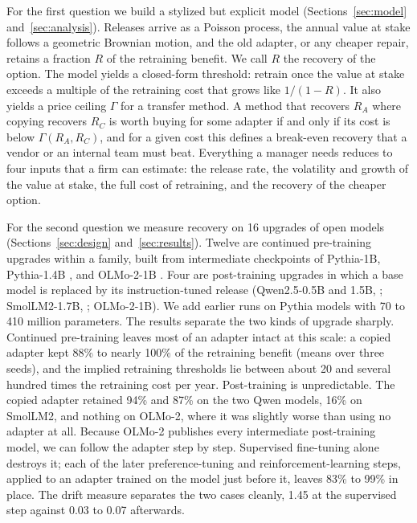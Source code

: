 \documentclass[ijds,nonblindrev]{informs4}
\begin{document}
For the first question we build a stylized but explicit model (Sections~\ref{sec:model} and~\ref{sec:analysis}). Releases arrive as a Poisson process, the annual value at stake follows a geometric Brownian motion, and the old adapter, or any cheaper repair, retains a fraction $R$ of the retraining benefit. We call $R$ the recovery of the option. The model yields a closed-form threshold: retrain once the value at stake exceeds a multiple of the retraining cost that grows like $1/(1-R)$. It also yields a price ceiling $\Gamma$ for a transfer method. A method that recovers $R_A$ where copying recovers $R_C$ is worth buying for some adapter if and only if its cost is below $\Gamma(R_A,R_C)$, and for a given cost this defines a break-even recovery that a vendor or an internal team must beat. Everything a manager needs reduces to four inputs that a firm can estimate: the release rate, the volatility and growth of the value at stake, the full cost of retraining, and the recovery of the cheaper option.

For the second question we measure recovery on 16 upgrades of open models (Sections~\ref{sec:design} and~\ref{sec:results}). Twelve are continued pre-training upgrades within a family, built from intermediate checkpoints of Pythia-1B, Pythia-1.4B \citep{biderman2023pythia}, and OLMo-2-1B \citep{olmo2024olmo2}. Four are post-training upgrades in which a base model is replaced by its instruction-tuned release (Qwen2.5-0.5B and 1.5B, \citealt{qwen2024qwen25}; SmolLM2-1.7B, \citealt{allal2025smollm2}; OLMo-2-1B). We add earlier runs on Pythia models with 70 to 410 million parameters. The results separate the two kinds of upgrade sharply. Continued pre-training leaves most of an adapter intact at this scale: a copied adapter kept 88\% to nearly 100\% of the retraining benefit (means over three seeds), and the implied retraining thresholds lie between about 20 and several hundred times the retraining cost per year. Post-training is unpredictable. The copied adapter retained 94\% and 87\% on the two Qwen models, 16\% on SmolLM2, and nothing on OLMo-2, where it was slightly worse than using no adapter at all. Because OLMo-2 publishes every intermediate post-training model, we can follow the adapter step by step. Supervised fine-tuning alone destroys it; each of the later preference-tuning and reinforcement-learning steps, applied to an adapter trained on the model just before it, leaves 83\% to 99\% in place. The drift measure separates the two cases cleanly, 1.45 at the supervised step against 0.03 to 0.07 afterwards.
\end{document}
